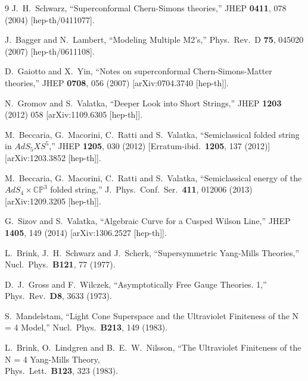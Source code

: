 \documentclass[a4paper,11pt]{article}
\numberwithin{equation}{section}
\begin{document}
\begin{thebibliography} {9}
  J.~H.~Schwarz,
  ``Superconformal Chern-Simons theories,''
  JHEP {\bf 0411}, 078 (2004)
  [hep-th/0411077].

  J.~Bagger and N.~Lambert,
  ``Modeling Multiple M2's,''
  Phys.\ Rev.\ D {\bf 75}, 045020 (2007)
  [hep-th/0611108].

  D.~Gaiotto and X.~Yin,
  ``Notes on superconformal Chern-Simons-Matter theories,''
  JHEP {\bf 0708}, 056 (2007)
  [arXiv:0704.3740 [hep-th]].

  N.~Gromov and S.~Valatka,
  ``Deeper Look into Short Strings,''
  JHEP {\bf 1203} (2012) 058
  [arXiv:1109.6305 [hep-th]].

  M.~Beccaria, G.~Macorini, C.~Ratti and S.~Valatka,
  ``Semiclassical folded string in $AdS_5 X S^5$,''
  JHEP {\bf 1205}, 030 (2012)
  [Erratum-ibid.\  {\bf 1205}, 137 (2012)]
  [arXiv:1203.3852 [hep-th]].

  M.~Beccaria, G.~Macorini, C.~Ratti and S.~Valatka,
  ``Semiclassical energy of the $AdS_4 \times \mathbb{CP}^3$ folded string,''
  J.\ Phys.\ Conf.\ Ser.\  {\bf 411}, 012006 (2013)
  [arXiv:1209.3205 [hep-th]].

  G.~Sizov and S.~Valatka,
  ``Algebraic Curve for a Cusped Wilson Line,''
  JHEP {\bf 1405}, 149 (2014)
  [arXiv:1306.2527 [hep-th]].

 L.~Brink, J.~H.~Schwarz and J.~Scherk, 
 ``Supersymmetric Yang-Mills Theories,''
  Nucl.\ Phys.\ {\bf B121}, 77 (1977).

	D.~J.~Gross and F.~Wilczek, 
	``Asymptotically Free Gauge Theories. 1,''
	Phys.\ Rev.\ {\bf D8}, 3633 (1973).

	S.~Mandelstam,
	``Light Cone Superspace and the Ultraviolet Finiteness of the N = 4 Model,''
	Nucl.\ Phys.\ {\bf B213}, 149 (1983).

	L.~Brink, O.~Lindgren and B.~E.~W.~Nilsson,
	``The Ultraviolet Finiteness of the N = 4 Yang-Mills Theory,\\
	Phys.\ Lett.\ {\bf B123}, 323 (1983).


\end{thebibliography}
\end{document}
